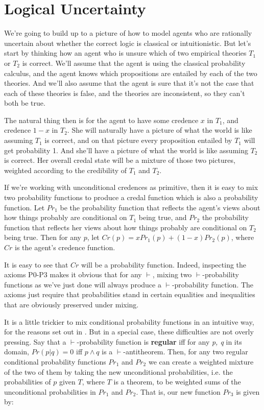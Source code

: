 \section{Logical Uncertainty}

We're going to build up to a picture of how to model agents who are rationally uncertain about whether the correct logic is classical or intuitionistic. But let's start by thinking how an agent who is unsure which of two empirical theories $T_1$ or $T_2$ is correct. We'll assume that the agent is using the classical probability calculus, and the agent knows which propositions are entailed by each of the two theories. And we'll also assume that the agent is sure that it's not the case that each of these theories is false, and the theories are inconsistent, so they can't both be true.

The natural thing then is for the agent to have some credence $x$ in $T_1$, and credence $1-x$ in $T_2$. She will naturally have a picture of what the world is like assuming $T_1$ is correct, and on that picture every proposition entailed by $T_1$ will get probability 1. And she'll have a picture of what the world is like assuming $T_2$ is correct. Her overall credal state will be a mixture of those two pictures, weighted according to the credibility of $T_1$ and $T_2$.

If we're working with unconditional credences as primitive, then it is easy to mix two probability functions to produce a credal function which is also a probability function. Let $Pr_1$ be the probability function that reflects the agent's views about how things probably are conditional on $T_1$ being true, and $Pr_2$ the probability function that reflects her views about how things probably are conditional on $T_2$ being true. Then for any $p$, let $Cr(p) = xPr_1(p) + (1-x)Pr_2(p)$, where $Cr$ is the agent's credence function.

It is easy to see that $Cr$ will be a probability function. Indeed, inspecting the axioms P0-P3 makes it obvious that for any $\vdash$, mixing two $\vdash$-probability functions as we've just done will always produce a $\vdash$-probability function. The axioms just require that probabilities stand in certain equalities and inequalities that are obviously preserved under mixing. 

It is a little trickier to mix conditional probability functions in an intuitive way, for the reasons set out in \citet{Jehle2009}. But in a special case, these difficulties are not overly pressing. Say that a $\vdash$-probability function is \textbf{regular} iff for any \emph{p, q} in its domain, $Pr(p | q) = 0$ iff $p \wedge q$ is a $\vdash$-antitheorem. Then, for any two regular conditional probability functions $Pr_1$ and $Pr_2$ we can create a weighted mixture of the two of them by taking the new unconditional probabilities, i.e. the probabilities of $p$ given $T$, where $T$ is a theorem, to be weighted sums of the unconditional probabilities in $Pr_1$ and $Pr_2$. That is, our new function $Pr_3$ is given by:

